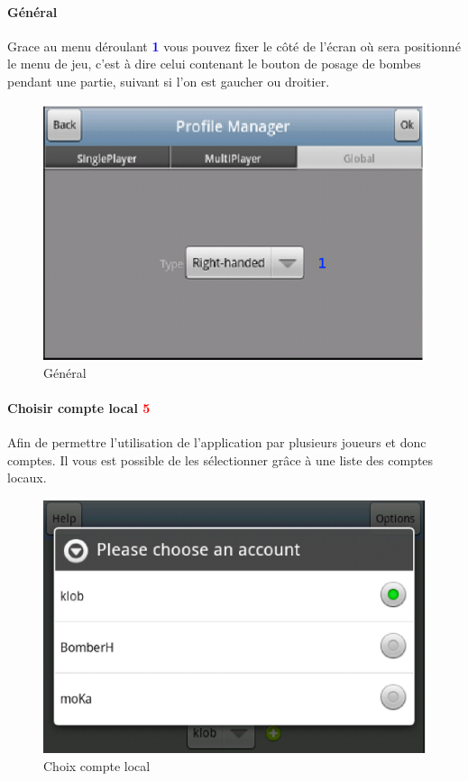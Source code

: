 		
		\paragraph{Général\\}
		Grace au menu déroulant \textcolor{blue}{\textbf{1}} vous pouvez fixer le
		côté de l'écran où sera positionné le menu de jeu, c'est à dire celui contenant le bouton de posage de bombes pendant une
		partie, suivant si l'on est gaucher ou droitier. 
		\begin{figure}[H]
			\centering
				\includegraphics[scale=0.7]{Manuel/Img/7}
				\caption{Général}
			\end{figure}
			
			
\paragraph{Choisir compte local \textcolor{red}{5}\\}
	Afin de permettre l'utilisation de l'application par plusieurs joueurs et donc
	comptes. Il vous est possible de les sélectionner grâce à une liste des comptes
	locaux. 
	\begin{figure}[H]
	\centering
		\includegraphics[scale=0.5]{Manuel/Img/8}
		\caption{Choix compte local}
	\end{figure}

